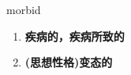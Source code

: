 
\begin{frame}
{\huge morbid}
\begin{center}
\begin{enumerate}\Large
  \item \textbf{疾病的，疾病所致的}
  \item \textbf{(思想性格)变态的}
\end{enumerate}
\end{center}
\end{frame}
